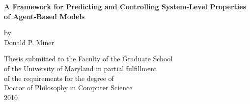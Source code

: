\begin{titlepage}
\mbox{}\vspace{1in}
\begin{center}

    {\Large \bf A Framework for Predicting and Controlling System-Level Properties of Agent-Based Models \par}
    
\vspace{2in}

    {\large by} \\
    {\large Donald P. Miner}
    
\vspace{2in}

  \begin{singlespace}
    Thesis submitted to the Faculty of the Graduate School \\
    of the University of Maryland in partial fulfillment \\
    of the requirements for the degree of \\
    Doctor of Philosophy in Computer Science \\
    2010
	\end{singlespace}
\end{center}
\end{titlepage}
